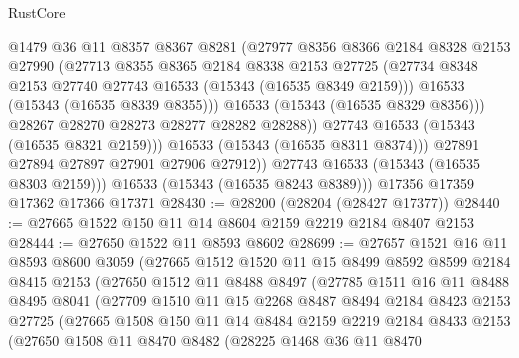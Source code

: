 \begin{lexlean}{RustCore}
\begin{coremodule}
                    @1479
                    @36
                    @11
                    @8357
                    @8367
                    @8281
                    (@27977
                      @8356
                      @8366
                      @2184
                      @8328
                      @2153
                      @27990
                      (@27713
                        @8355
                        @8365
                        @2184
                        @8338
                        @2153
                        @27725
                        (@27734 @8348 @2153 @27740 @27743 @16533 (@15343 (@16535 @8349 @2159)))
                        @16533
                        (@15343 (@16535 @8339 @8355)))
                      @16533
                      (@15343 (@16535 @8329 @8356)))
                    @28267
                    @28270
                    @28273
                    @28277
                    @28282
                    @28288))
                @27743
                @16533
                (@15343 (@16535 @8321 @2159)))
              @16533
              (@15343 (@16535 @8311 @8374)))
            @27891
            @27894
            @27897
            @27901
            @27906
            @27912))
        @27743
        @16533
        (@15343 (@16535 @8303 @2159)))
      @16533
      (@15343 (@16535 @8243 @8389)))
    @17356
    @17359
    @17362
    @17366
    @17371
@28430 := @28200 (@28204 (@28427 @17377))
@28440 := @27665 @1522 @150 @11 @14 @8604 @2159 @2219 @2184 @8407 @2153
@28444 := @27650 @1522 @11 @8593 @8602
@28699 := @27657
    @1521
    @16
    @11
    @8593
    @8600
    @3059
    (@27665
      @1512
      @1520
      @11
      @15
      @8499
      @8592
      @8599
      @2184
      @8415
      @2153
      (@27650
        @1512
        @11
        @8488
        @8497
        (@27785
          @1511
          @16
          @11
          @8488
          @8495
          @8041
          (@27709
            @1510
            @11
            @15
            @2268
            @8487
            @8494
            @2184
            @8423
            @2153
            @27725
            (@27665
              @1508
              @150
              @11
              @14
              @8484
              @2159
              @2219
              @2184
              @8433
              @2153
              (@27650
                @1508
                @11
                @8470
                @8482
                (@28225
                  @1468
                  @36
                  @11
                  @8470

\end{coremodule}
\end{lexlean}
